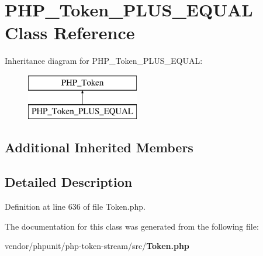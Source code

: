 \section{P\+H\+P\+\_\+\+Token\+\_\+\+P\+L\+U\+S\+\_\+\+E\+Q\+U\+A\+L Class Reference}
\label{class_p_h_p___token___p_l_u_s___e_q_u_a_l}
Inheritance diagram for P\+H\+P\+\_\+\+Token\+\_\+\+P\+L\+U\+S\+\_\+\+E\+Q\+U\+A\+L\+:\begin{figure}[H]
\begin{center}
\leavevmode
\includegraphics[height=2.000000cm]{class_p_h_p___token___p_l_u_s___e_q_u_a_l}
\end{center}
\end{figure}
\subsection*{Additional Inherited Members}


\subsection{Detailed Description}


Definition at line 636 of file Token.\+php.



The documentation for this class was generated from the following file\+:\begin{DoxyCompactItemize}
\item 
vendor/phpunit/php-\/token-\/stream/src/{\bf Token.\+php}\end{DoxyCompactItemize}
